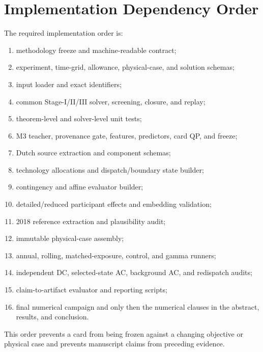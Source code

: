 \documentclass[10pt,journal,onecolumn]{IEEEtran}
\begin{document}
\section{Implementation Dependency Order}
\label{app:dependency}

The required implementation order is:
\begin{enumerate}[leftmargin=*,itemsep=1pt]
\item methodology freeze and machine-readable contract;
\item experiment, time-grid, allowance, physical-case, and solution schemas;
\item input loader and exact identifiers;
\item common Stage-I/II/III solver, screening, closure, and replay;
\item theorem-level and solver-level unit tests;
\item M3 teacher, provenance gate, features, predictors, card QP, and freeze;
\item Dutch source extraction and component schemas;
\item technology allocations and dispatch/boundary state builder;
\item contingency and affine evaluator builder;
\item detailed/reduced participant effects and embedding validation;
\item 2018 reference extraction and plausibility audit;
\item immutable physical-case assembly;
\item annual, rolling, matched-exposure, control, and gamma runners;
\item independent DC, selected-state AC, background AC, and redispatch audits;
\item claim-to-artifact evaluator and reporting scripts;
\item final numerical campaign and only then the numerical clauses in the abstract,
results, and conclusion.
\end{enumerate}
This order prevents a card from being frozen against a changing objective or
physical case and prevents manuscript claims from preceding evidence.
\end{document}
